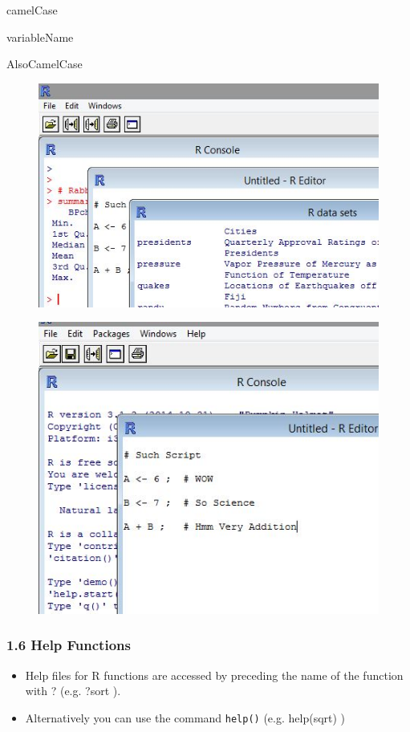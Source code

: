  \begin{semiverbatim}
 camelCase
 
 variableName
 
 AlsoCamelCase
 \end{semiverbatim}
 
 
 \begin{figure}
 \centering
 \includegraphics[width=0.7\linewidth]{images/Rmultiplewindows}
 \end{figure}
 
    
 
 \begin{figure}
 \centering
 \includegraphics[width=0.7\linewidth]{images/Rscript}         
 \end{figure}
    
 
 
 \frametitle{1.6 Help Functions}
 \begin{itemize}
 \item Help files for R functions are accessed by preceding the name of the function with ? (e.g. ?sort
 ). 
 
 \item Alternatively you can use the command \texttt{help()} (e.g. help(sqrt) )
 \end{itemize}
 
